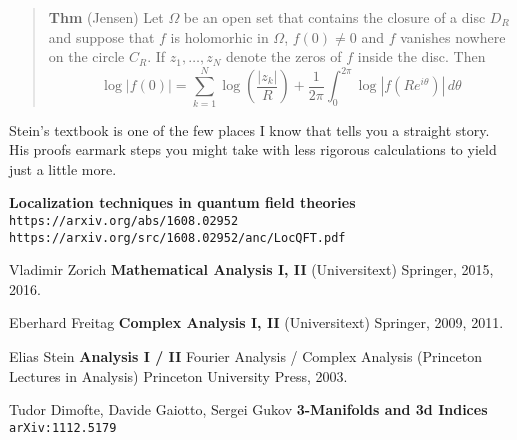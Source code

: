 \documentclass[12pt]{article}
\begin{document}
\begin{quotation}\noindent \textbf{Thm} (Jensen) Let $\Omega$ be an open set that contains the closure of a disc $D_R$ and suppose that $f$ is holomorhic in $\Omega$, $f(0) \neq 0$ and $f$ vanishes nowhere on the circle $C_R$.  If $z_1, \dots, z_N$ denote the zeros of $f$ inside the disc.  Then
$$ \log|f(0)| = \sum_{k=1}^N \log \left( \frac{|z_k|}{R}\right) 
+ \frac{1}{2\pi} \int_0^{2\pi} \log |f(Re^{i\theta})| \, d\theta $$\end{quotation}
Stein's textbook is one of the few places I know that tells you a straight story.  His proofs earmark steps you might take with less rigorous calculations to yield just a little more.

\vfill

\begin{thebibliography}{}

\item \textbf{Localization techniques in quantum field theories} \\ 
\texttt{https://arxiv.org/abs/1608.02952} \\ 
\texttt{https://arxiv.org/src/1608.02952/anc/LocQFT.pdf}

\item Vladimir Zorich \textbf{Mathematical Analysis I, II} (Universitext) Springer, 2015, 2016.

\item Eberhard Freitag \textbf{Complex Analysis I, II} (Universitext) Springer, 2009, 2011.

\item Elias Stein \textbf{Analysis I / II } Fourier Analysis / Complex Analysis (Princeton Lectures in Analysis) Princeton University Press, 2003.

\item Tudor Dimofte, Davide Gaiotto, Sergei Gukov \textbf{3-Manifolds and 3d Indices} \texttt{arXiv:1112.5179}

\end{thebibliography}
\end{document}
